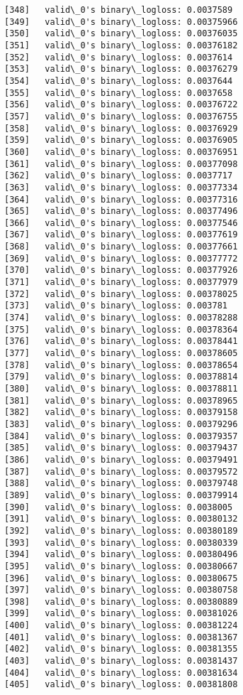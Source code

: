 \documentclass[11pt]{article}
\begin{document}
\begin{Verbatim}[commandchars=\\\{\}]
[348]	valid\_0's binary\_logloss: 0.0037589
[349]	valid\_0's binary\_logloss: 0.00375966
[350]	valid\_0's binary\_logloss: 0.00376035
[351]	valid\_0's binary\_logloss: 0.00376182
[352]	valid\_0's binary\_logloss: 0.0037614
[353]	valid\_0's binary\_logloss: 0.00376279
[354]	valid\_0's binary\_logloss: 0.0037644
[355]	valid\_0's binary\_logloss: 0.0037658
[356]	valid\_0's binary\_logloss: 0.00376722
[357]	valid\_0's binary\_logloss: 0.00376755
[358]	valid\_0's binary\_logloss: 0.00376929
[359]	valid\_0's binary\_logloss: 0.00376905
[360]	valid\_0's binary\_logloss: 0.00376951
[361]	valid\_0's binary\_logloss: 0.00377098
[362]	valid\_0's binary\_logloss: 0.0037717
[363]	valid\_0's binary\_logloss: 0.00377334
[364]	valid\_0's binary\_logloss: 0.00377316
[365]	valid\_0's binary\_logloss: 0.00377496
[366]	valid\_0's binary\_logloss: 0.00377546
[367]	valid\_0's binary\_logloss: 0.00377619
[368]	valid\_0's binary\_logloss: 0.00377661
[369]	valid\_0's binary\_logloss: 0.00377772
[370]	valid\_0's binary\_logloss: 0.00377926
[371]	valid\_0's binary\_logloss: 0.00377979
[372]	valid\_0's binary\_logloss: 0.00378025
[373]	valid\_0's binary\_logloss: 0.003781
[374]	valid\_0's binary\_logloss: 0.00378288
[375]	valid\_0's binary\_logloss: 0.00378364
[376]	valid\_0's binary\_logloss: 0.00378441
[377]	valid\_0's binary\_logloss: 0.00378605
[378]	valid\_0's binary\_logloss: 0.00378654
[379]	valid\_0's binary\_logloss: 0.00378814
[380]	valid\_0's binary\_logloss: 0.00378811
[381]	valid\_0's binary\_logloss: 0.00378965
[382]	valid\_0's binary\_logloss: 0.00379158
[383]	valid\_0's binary\_logloss: 0.00379296
[384]	valid\_0's binary\_logloss: 0.00379357
[385]	valid\_0's binary\_logloss: 0.00379437
[386]	valid\_0's binary\_logloss: 0.00379491
[387]	valid\_0's binary\_logloss: 0.00379572
[388]	valid\_0's binary\_logloss: 0.00379748
[389]	valid\_0's binary\_logloss: 0.00379914
[390]	valid\_0's binary\_logloss: 0.0038005
[391]	valid\_0's binary\_logloss: 0.00380132
[392]	valid\_0's binary\_logloss: 0.00380189
[393]	valid\_0's binary\_logloss: 0.00380339
[394]	valid\_0's binary\_logloss: 0.00380496
[395]	valid\_0's binary\_logloss: 0.00380667
[396]	valid\_0's binary\_logloss: 0.00380675
[397]	valid\_0's binary\_logloss: 0.00380758
[398]	valid\_0's binary\_logloss: 0.00380889
[399]	valid\_0's binary\_logloss: 0.00381026
[400]	valid\_0's binary\_logloss: 0.00381224
[401]	valid\_0's binary\_logloss: 0.00381367
[402]	valid\_0's binary\_logloss: 0.00381355
[403]	valid\_0's binary\_logloss: 0.00381437
[404]	valid\_0's binary\_logloss: 0.00381634
[405]	valid\_0's binary\_logloss: 0.00381808

\end{Verbatim}
\end{document}
